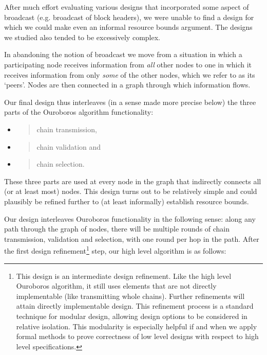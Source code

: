\documentclass[11pt,a4paper]{article}
\begin{document}
After much effort evaluating various designs that incorporated some
aspect of broadcast (e.g. broadcast of block headers), we were unable to
find a design for which we could make even an informal resource bounds
argument. The designs we studied also tended to be excessively complex.

In abandoning the notion of broadcast we move from a situation in which
a participating node receives information from \emph{all} other nodes to
one in which it receives information from only \emph{some} of the other
nodes, which we refer to as its `peers'. Nodes are then connected in a
graph through which information flows.

Our final design thus interleaves (in a sense made more precise below)
the three parts of the Ouroboros algorithm functionality:

\begin{itemize}
\item
  \begin{quote}
  chain transmission,
  \end{quote}
\item
  \begin{quote}
  chain validation and
  \end{quote}
\item
  \begin{quote}
  chain selection.
  \end{quote}
\end{itemize}

These three parts are used at every node in the graph that indirectly
connects all (or at least most) nodes. This design turns out to be
relatively simple and could plausibly be refined further to (at least
informally) establish resource bounds.

Our design interleaves Ouroboros functionality in the following sense:
along any path through the graph of nodes, there will be multiple rounds
of chain transmission, validation and selection, with one round per hop
in the path. After the first design refinement\footnote{This design is
  an intermediate design refinement. Like the high level Ouroboros
  algorithm, it still uses elements that are not directly implementable
  (like transmitting whole chains). Further refinements will attain
  directly implementable design. This refinement process is a standard
  technique for modular design, allowing design options to be considered
  in relative isolation. This modularity is especially helpful if and
  when we apply formal methods to prove correctness of low level designs
  with respect to high level specifications.} step, our high level
algorithm is as follows:
\end{document}
